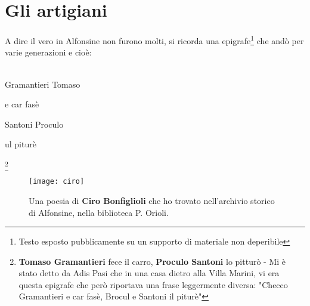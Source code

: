
\chapter{Gli artigiani}

A dire il vero in Alfonsine non furono molti, si ricorda una epigrafe\footnote{Testo esposto pubblicamente su un supporto di materiale non deperibile} che andò per varie generazioni e cioè:
\\\\
\textcal \Huge
	\centerline{Gramantieri Tomaso}
	\centerline{e car fasè}
	\centerline{Santoni Proculo}
	\centerline{ul piturè}\normalfont \normalsize \footnote{\textbf{Tomaso Gramantieri} fece il carro, \textbf{Proculo Santoni} lo pitturò - Mi è stato detto da Adis Pasi che in una casa dietro alla Villa Marini, vi era questa epigrafe che però riportava una frase leggermente diversa: "Checco Gramantieri e car fasè, Brocul e Santoni il piturè"}


 \begin{figure}[htb]
    \centering
    \vspace{-0.3cm}
    \texttt{[image: ciro]}
    \caption[Poesia Ciro Bonfiglioli]{Una poesia di \textbf{Ciro Bonfiglioli} che ho trovato nell'archivio storico di Alfonsine, nella biblioteca P. Orioli.\label{fig:ciro}}
    \vspace{-0.7cm}
\end{figure}


